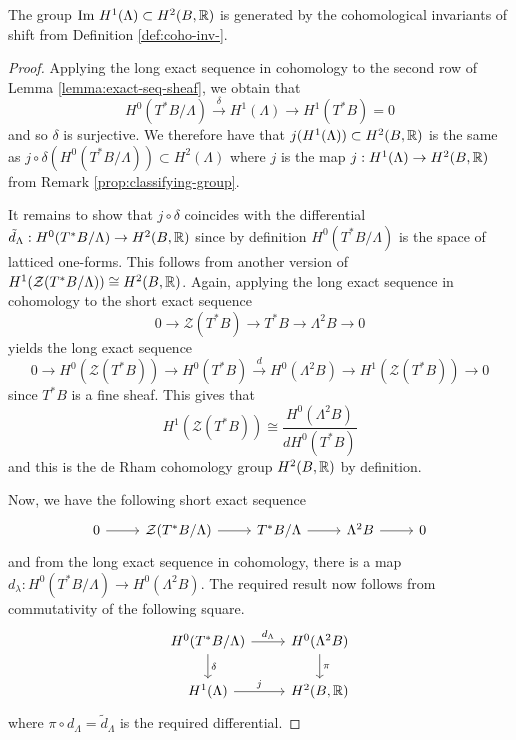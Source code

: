 \begin{prop}\label{prop:generated-shifts}
    The group $\text{Im } H^1(\Lambda) \subset H^2(B, \mathbb{R})$ is generated by the cohomological invariants of shift from Definition \ref{def:coho-inv-}.
\end{prop}
\begin{proof}
    Applying the long exact
    sequence in cohomology to the second row of Lemma \ref{lemma:exact-seq-sheaf}, we obtain that
    $$
        H^0(T^*B/\Lambda) \xrightarrow{\delta} H^1(\Lambda) \to H^1(T^*B) =0
    $$
    and so $\delta$ is surjective. We therefore have that $j(H^1(\Lambda)) \subset H^2(B,\mathbb{R})$ is the same
    as $j \circ \delta(H^0(T^*B/\Lambda)) \subset H^2(\Lambda)$ where $j$ is the map
    $j: H^1(\Lambda) \to H^2(B, \mathbb{R})$ from Remark \ref{prop:classifying-group}.

    It remains to show that $j \circ \delta$ coincides with the differential
    $\tilde{d}_{\Lambda}: H^0(T^*B/\Lambda) \to H^2(B, \mathbb{R})$ since by definition
    $H^0(T^*B/\Lambda)$ is the space of latticed one-forms. This follows from
    another version of $H^1(\mathcal{Z}(T^*B/\Lambda)) \cong H^2(B, \mathbb{R})$. Again,
    applying the long exact sequence in cohomology to the short exact sequence $$ 0
        \to \mathcal{Z} (T^*B) \to T^*B \to \Lambda^2 B \to 0 $$ yields the long exact
    sequence $$ 0 \to H^0(\mathcal{Z} (T^*B)) \to H^0(T^*B) \xrightarrow{d}
        H^0(\Lambda^2 B) \to H^1(\mathcal{Z} (T^*B)) \to 0 $$ since $T^*B$ is a fine
    sheaf. This gives that $$ H^1(\mathcal{Z} (T^*B)) \cong \dfrac{H^0(\Lambda^2
            B)}{dH^0(T^*B)} $$ and this is the de Rham cohomology group $H^2(B, \mathbb{R})$ by
    definition.

    Now, we have the following short exact sequence
    \[
        \begin{tikzcd}
            0 \arrow[r] & \mathcal{Z}(T^*B/\Lambda) \arrow[r]
            & T^*B / \Lambda  \arrow[r]
            & \Lambda^2 B \arrow[r]
            & 0
        \end{tikzcd}
    \]
    and from the long exact sequence in cohomology, there is a map $d_{\lambda}:
        H^0(T^*B/\Lambda) \to H^0(\Lambda^2 B)$. The required result now follows from
    commutativity of the following square.
    \[
        \begin{tikzcd}
            H^0(T^*B/\Lambda) \arrow[r, "d_{\Lambda}"] \arrow[d, "\delta"] & H^0(\Lambda^2 B) \arrow[d, "\pi"] \\
            H^1(\Lambda) \arrow[r, "j"] & H^2(B, \R)
        \end{tikzcd}
    \]
    where $\pi \circ d_{\Lambda} = \tilde{d}_{\Lambda}$ is the required
    differential.
\end{proof}

